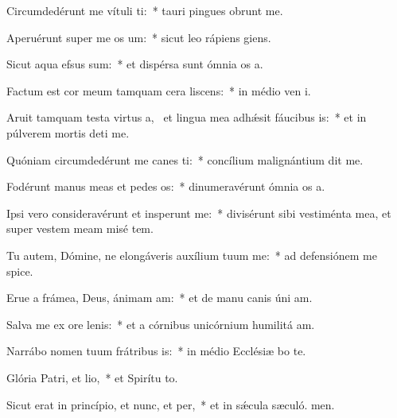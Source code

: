 \item Circumdedérunt me vítuli ti:~* tauri pingues obrunt me.
\item Aperuérunt super me os um:~* sicut leo rápiens  giens.
\item Sicut aqua efsus sum:~* et dispérsa sunt ómnia os a.
\item Factum est cor meum tamquam cera liscens:~* in médio ven i.
\item Aruit tamquam testa virtus a,~\pscross{} et lingua mea adhǽsit fáucibus is:~* et in púlverem mortis deti me.
\item Quóniam circumdedérunt me canes ti:~* concílium malignántium dit me.
\item Fodérunt manus meas et pedes os:~* dinumeravérunt ómnia os a.
\item Ipsi vero consideravérunt et insperunt me:~* divisérunt sibi vestiménta mea, et super vestem meam misé tem.
\item Tu autem, Dómine, ne elongáveris auxílium tuum  me:~* ad defensiónem me spice.
\item Erue a frámea, Deus, ánimam am:~* et de manu canis úni am.
\item Salva me ex ore lenis:~* et a córnibus unicórnium humilitá am.
\item Narrábo nomen tuum frátribus is:~* in médio Ecclésiæ bo te.
\item Glória Patri, et lio,~* et Spirítu to.
\item Sicut erat in princípio, et nunc, et per,~* et in sǽcula sæculó. men.
